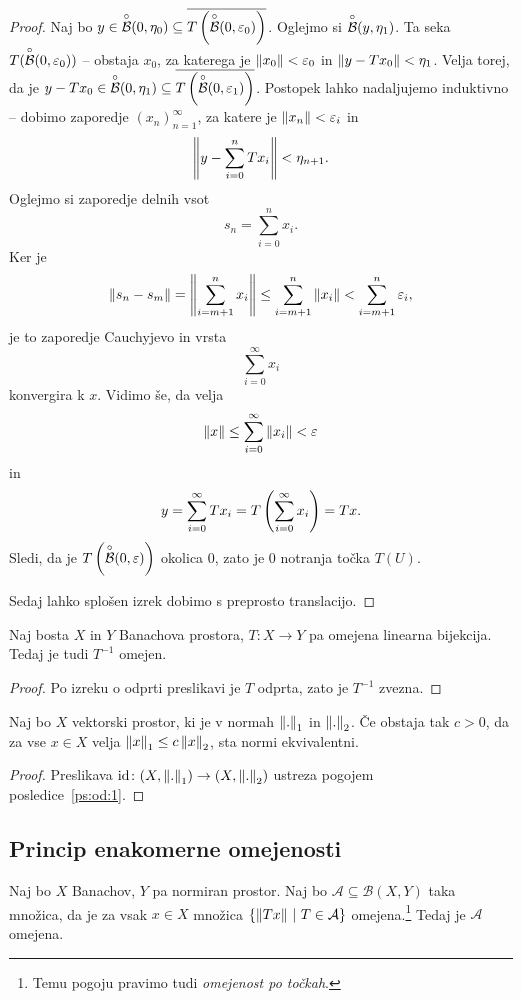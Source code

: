 \begin{proof}
Naj bo $y \in \overset{\circ}{\mathcal{B}}(0, \eta_0) \subseteq
\overline{T\left(\overset{\circ}{\mathcal{B}}(0, \varepsilon_0)\right)}$. Oglejmo si
$\overset{\circ}{\mathcal{B}}(y, \eta_1)$. Ta seka $T(\overset{\circ}{\mathcal{B}}(0, \varepsilon_0))$ -- obstaja
$x_0$, za katerega je $\left\lVert x_0\right\rVert < \varepsilon_0$ in
$\left\lVert y - Tx_0\right\rVert < \eta_1$. Velja torej, da je
$y-Tx_0 \in \overset{\circ}{\mathcal{B}}(0, \eta_1) \subseteq
\overline{T\left(\overset{\circ}{\mathcal{B}}(0, \varepsilon_1)\right)}$. Postopek lahko nadaljujemo
induktivno -- dobimo zaporedje $(x_n)_{n=1}^\infty$, za katere je
$\left\lVert x_n\right\rVert < \varepsilon_i$ in
\[
\left\lVert y - \sum_{i=0}^n Tx_i\right\rVert < \eta_{n+1}.
\]
Oglejmo si zaporedje delnih vsot
\[
s_n = \sum_{i=0}^n x_i.
\]
Ker je
\[
\left\lVert s_n - s_m\right\rVert = \left\lVert \sum_{i=m+1}^n x_i\right\rVert \leq
\sum_{i=m+1}^n \left\lVert x_i\right\rVert < \sum_{i=m+1}^n \varepsilon_i,
\]
je to zaporedje Cauchyjevo in vrsta
\[
\sum_{i=0}^\infty x_i
\]
konvergira k $x$. Vidimo še, da velja
\[
\left\lVert x\right\rVert \leq \sum_{i=0}^\infty \left\lVert x_i\right\rVert < \varepsilon
\]
in
\[
y = \sum_{i=0}^\infty Tx_i = T\left(\sum_{i=0}^\infty x_i\right) = Tx.
\]
Sledi, da je $T\left(\overset{\circ}{\mathcal{B}}(0,\varepsilon)\right)$ okolica $0$, zato je
$0$ notranja točka $T(U)$.

Sedaj lahko splošen izrek dobimo s preprosto translacijo.
\end{proof}

\begin{posledica}\label{ps:od:1}
Naj bosta $X$ in $Y$ Banachova prostora, $T \colon X \to Y$ pa
omejena linearna bijekcija. Tedaj je tudi $T^{-1}$ omejen.
\end{posledica}

\begin{proof}
Po izreku o odprti preslikavi je $T$ odprta, zato je $T^{-1}$
zvezna.
\end{proof}

\begin{posledica}
Naj bo $X$ vektorski prostor, ki je v normah $\left\lVert .\right\rVert_1$ in
$\left\lVert .\right\rVert_2$. Če obstaja tak $c > 0$, da za vse $x \in X$ velja
$\left\lVert x\right\rVert_1 \leq c \left\lVert x\right\rVert_2$, sta normi ekvivalentni.
\end{posledica}

\begin{proof}
Preslikava $\operatorname{id} \colon (X, \left\lVert .\right\rVert_1) \to (X, \left\lVert .\right\rVert_2)$ ustreza
pogojem posledice~\ref{ps:od:1}.
\end{proof}

\newpage

\subsection{Princip enakomerne omejenosti}

\begin{izrek}
\label{iz:bs:1}
Naj bo $X$ Banachov, $Y$ pa normiran prostor. Naj bo
$\mathcal{A} \subseteq \mathcal{B}(X,Y)$ taka množica, da je za
vsak $x \in X$ množica $\left\{\left\lVert Tx\right\rVert~\middle\vert~T \in \mathcal{A}\right\}$
omejena.\footnote{Temu pogoju pravimo tudi \emph{omejenost po
točkah}.} Tedaj je $\mathcal{A}$ omejena.
\end{izrek}

